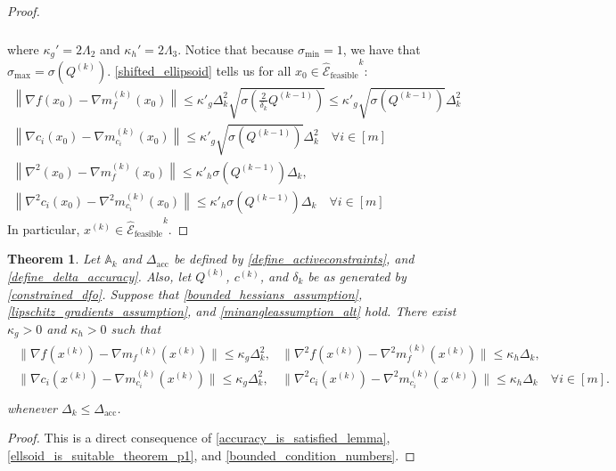 \documentclass{article}
\newtheorem{theorem}{Theorem}[section]
\theoremstyle{case}
\numberwithin{theorem}{subsection}
\newcommand{\activeconstraintsk}{{\mathbb A_{k}}}
\newcommand{\ck}{{c^{(k)}}}
\newcommand{\dacc}{{\Delta_{\textrm{acc}}}}
\newcommand{\dk}{\Delta_k}
\newcommand{\gmcik}{{\nabla m_{c_i}^{(k)}\left(\xk\right)}}
\newcommand{\gradf}{\nabla f}
\newcommand{\hk}{{\nabla^2m_f^{(k)}\left(\xk\right)}}
\newcommand{\mfk}{{{m}_f}^{(k)}}
\newcommand{\qk}{{Q^{(k)}}}
\newcommand{\scaledunshiftedellipsoid}{{{\mathcal {\hat E}_{\text{feasible}}}^k}}
\newcommand{\sdk}{{\delta_k}}
\newcommand{\sigmamax}{{\sigma_{\textrm{max}}}}
\newcommand{\xk}{x^{(k)}}
\newcommand{\qkmo}{{Q^{(k-1)}}}
\begin{document}
\begin{proof}
\begin{align*}
\begin{array}{cc}
\end{array}
\end{align*}
where $\kappa_{g}' = 2 \Lambda_2$ and $\kappa_{h}' = 2\Lambda_3$.
Notice that because $\sigma_{\textrm{min}} = 1$, we have that $\sigmamax = \sigma \left(\qk\right)$.
\cref{shifted_ellipsoid} tells us for all $x_0 \in \scaledunshiftedellipsoid$:
\begin{align*}
\left\|\gradf\left(x_0 \right) - \nabla m^{(k)}_f\left(x_0\right)\right\| \le 
\kappa'_g  \dk^2 \sqrt{\sigma\left(\frac 2 {\sdk} \qkmo\right)} \le \kappa'_g \sqrt{\sigma\left(\qkmo\right)}\dk^2 \\
\left\|\nabla {c_i}\left(x_0 \right) - \nabla m^{(k)}_{c_i}\left(x_0\right)\right\| \le \kappa'_g\sqrt{\sigma\left(\qkmo\right)} \dk^2 \quad \forall i \in [m] \\
\left\|\nabla^2\left(x_0 \right) - \nabla m^{(k)}_f\left(x_0\right)\right\| \le \kappa'_h\sigma\left(\qkmo\right)\dk, \\
\left\|\nabla^2 {c_i}\left(x_0 \right) - \nabla^2 m^{(k)}_{c_i}\left(x_0\right)\right\| \le \kappa'_h\sigma\left(\qkmo\right)\dk \quad \forall i \in [m]
\end{align*}
In particular, $\xk \in \scaledunshiftedellipsoid$.
\end{proof}


\begin{theorem}
\label{accuracy_is_satisfied}
Let $\activeconstraintsk$ and $\dacc$ be defined by \cref{define_activeconstraints}, and \cref{define_delta_accuracy}.
Also, let $\qk$, $\ck$, and $\sdk$ 
be as generated by \cref{constrained_dfo}.
Suppose that 
\cref{bounded_hessians_assumption}, \cref{lipschitz_gradients_assumption}, and \cref{minangleassumption_alt} hold.
There exist $\kappa_g>0$ and $\kappa_h>0$ such that
\begin{align*}
\begin{array}{ccc}
\|\gradf(\xk) - \nabla \mfk(\xk) \| \le \kappa_g \dk^2, & \|\nabla^2 f(\xk) - \hk \| \le \kappa_h \dk, & \\
\|\nabla c_i(\xk) - \gmcik \| \le \kappa_g \dk^2, & \|\nabla^2 c_i(\xk) - \nabla^2 m_{c_i}^{(k)}(\xk) \| \le \kappa_h \dk & \forall i \in [m]. \\
\end{array}
\end{align*}
whenever $\dk \le \dacc$.
\end{theorem}
\begin{proof}
This is a direct consequence of \cref{accuracy_is_satisfied_lemma}, \cref{ellsoid_is_suitable_theorem_p1}, and \cref{bounded_condition_numbers}.
\end{proof}
\end{document}
